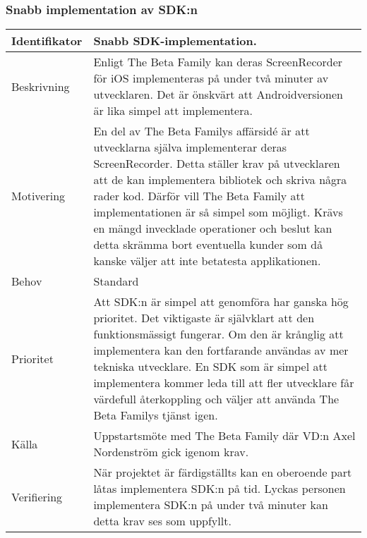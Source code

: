 \subsubsection{Snabb implementation av SDK:n}
\begin{tabular}{ | p{65pt} | p{300pt} |}
  \hline
  Identifikator &
  Snabb SDK-implementation.
  \\ \hline
  Beskrivning & 
  Enligt The Beta Family kan deras ScreenRecorder för iOS implementeras på under två minuter av utvecklaren. Det är önskvärt att Androidversionen är lika simpel att implementera.
  \\ \hline
  Motivering &
  En del av The Beta Familys affärsidé är att utvecklarna själva implementerar deras ScreenRecorder. Detta ställer krav på utvecklaren att de kan implementera bibliotek och skriva några rader kod. Därför vill The Beta Family att implementationen är så simpel som möjligt. Krävs en mängd invecklade operationer och beslut kan detta skrämma bort eventuella kunder som då kanske väljer att inte betatesta applikationen.
  \\ \hline
  Behov &
  Standard
  \\ \hline
  Prioritet &
  Att SDK:n är simpel att genomföra har ganska hög prioritet. Det viktigaste är självklart att den funktionsmässigt fungerar. Om den är krånglig att implementera kan den fortfarande användas av mer tekniska utvecklare. En SDK som är simpel att implementera kommer leda till att fler utvecklare får värdefull återkoppling och väljer att använda The Beta Familys tjänst igen.
  \\ \hline
  Källa &
  Uppstartsmöte med The Beta Family där VD:n Axel Nordenström gick igenom krav.
  \\ \hline
  Verifiering &
  När projektet är färdigställts kan en oberoende part låtas implementera SDK:n på tid. Lyckas personen implementera SDK:n på under två minuter kan detta krav ses som uppfyllt.
  \\ \hline
\end{tabular}

